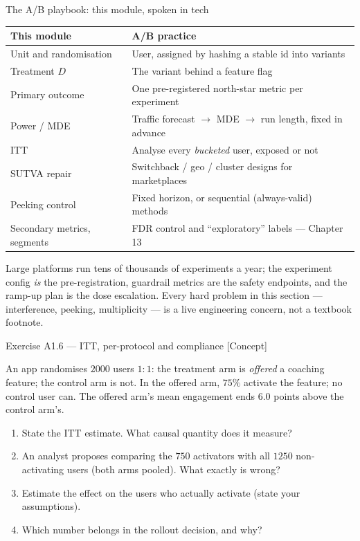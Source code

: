 \documentclass[aspectratio=169,11pt]{beamer}
\begin{document}
\begin{frame}{The A/B playbook: this module, spoken in tech}
  \scriptsize
  \begin{center}
  \begin{tabular}{@{}p{4.1cm}p{7.9cm}@{}}
    \toprule
    \textbf{This module} & \textbf{A/B practice} \\
    \midrule
    Unit and randomisation & User, assigned by hashing a stable id into variants \\
    Treatment $D$ & The variant behind a feature flag \\
    Primary outcome & One pre-registered north-star metric per experiment \\
    Power / MDE & Traffic forecast $\to$ MDE $\to$ run length, fixed in advance \\
    ITT & Analyse every \emph{bucketed} user, exposed or not \\
    SUTVA repair & Switchback / geo / cluster designs for marketplaces \\
    Peeking control & Fixed horizon, or sequential (always-valid) methods \\
    Secondary metrics, segments & FDR control and ``exploratory'' labels --- Chapter 13 \\
    \bottomrule
  \end{tabular}
  \end{center}
  \begin{industry}
    Large platforms run tens of thousands of experiments a year; the experiment config
    \emph{is} the pre-registration, guardrail metrics are the safety endpoints, and the
    ramp-up plan is the dose escalation. Every hard problem in this section ---
    interference, peeking, multiplicity --- is a live engineering concern, not a
    textbook footnote.
  \end{industry}
\end{frame}

\begin{frame}{Exercise A1.6 --- ITT, per-protocol and compliance [Concept]}
\begin{exercise}
  An app randomises $2000$ users $1{:}1$: the treatment arm is \emph{offered} a coaching
  feature; the control arm is not. In the offered arm, $75\%$ activate the feature;
  no control user can. The offered arm's mean engagement ends $6.0$ points above the
  control arm's.
  \begin{enumerate}
    \item State the ITT estimate. What causal quantity does it measure?
    \item An analyst proposes comparing the $750$ activators with all $1250$
          non-activating users (both arms pooled). What exactly is wrong?
    \item Estimate the effect on the users who actually activate (state your assumptions).
    \item Which number belongs in the rollout decision, and why?
  \end{enumerate}
\end{exercise}
\end{frame}
\end{document}
